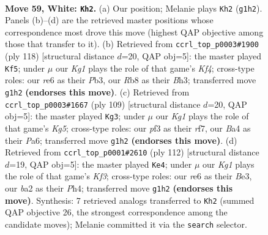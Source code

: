 \documentclass[11pt]{article}
\begin{document}
\clearpage

\begin{figure}[p]\centering
\begin{subfigure}{0.46\textwidth}\centering
\resizebox{\linewidth}{!}{%
\newchessgame
\chessboard[
  setfen={1R6/6k1/4r3/8/B3p2p/4Bp1P/b4P2/6K1 w - - 28 59},
  showmover=false,
  pgfstyle=straightmove, color=movearrow, markmove={g1-h2}
]}
\caption{}
\end{subfigure}\hfill
\begin{subfigure}{0.46\textwidth}\centering
\resizebox{\linewidth}{!}{%
\newchessgame
\chessboard[
  setfen={3k4/5p2/1p6/p1b1P3/P4K1p/1P5B/8/8 w - - 36 60},
  showmover=false,
  pgfstyle=straightmove, color=movearrow, markmove={f4-f5}
]}
\caption{}
\end{subfigure}
\\[4pt]
\begin{subfigure}{0.46\textwidth}\centering
\resizebox{\linewidth}{!}{%
\newchessgame
\chessboard[
  setfen={8/5R2/p2p4/P1b5/1pP3k1/8/KPB5/4r3 b - - 0 55},
  showmover=false,
  pgfstyle=straightmove, color=movearrow, markmove={g4-g3}
]}
\caption{}
\end{subfigure}\hfill
\begin{subfigure}{0.46\textwidth}\centering
\resizebox{\linewidth}{!}{%
\newchessgame
\chessboard[
  setfen={7k/6p1/3r4/p6p/1pB4P/1P2BK2/P7/8 w - - 3 57},
  showmover=false,
  pgfstyle=straightmove, color=movearrow, markmove={f3-e4}
]}
\caption{}
\end{subfigure}
\caption{\textbf{Move 59, White: \texttt{Kh2}.} (a) Our position; Melanie plays \texttt{Kh2} (\texttt{g1h2}). Panels (b)--(d) are the retrieved master positions whose correspondence most drove this move (highest QAP objective among those that transfer to it). (b) Retrieved from \texttt{ccrl\_top\_p0003\#1900} (ply 118) [structural distance $d$=20, QAP obj=5]: the master played \texttt{Kf5}; under $\mu$ our \emph{Kg1} plays the role of that game's \emph{Kf4}; cross-type roles: our \emph{r}e6 as their \emph{P}b3, our \emph{R}b8 as their \emph{B}h3; transferred move \texttt{g1h2} \textbf{(endorses this move)}. (c) Retrieved from \texttt{ccrl\_top\_p0003\#1667} (ply 109) [structural distance $d$=20, QAP obj=5]: the master played \texttt{Kg3}; under $\mu$ our \emph{Kg1} plays the role of that game's \emph{Kg5}; cross-type roles: our \emph{p}f3 as their \emph{r}f7, our \emph{B}a4 as their \emph{P}a6; transferred move \texttt{g1h2} \textbf{(endorses this move)}. (d) Retrieved from \texttt{ccrl\_top\_p0001\#2610} (ply 112) [structural distance $d$=19, QAP obj=5]: the master played \texttt{Ke4}; under $\mu$ our \emph{Kg1} plays the role of that game's \emph{Kf3}; cross-type roles: our \emph{r}e6 as their \emph{B}e3, our \emph{b}a2 as their \emph{P}h4; transferred move \texttt{g1h2} \textbf{(endorses this move)}. Synthesis: 7 retrieved analogs transferred to \texttt{Kh2} (summed QAP objective 26, the strongest correspondence among the candidate moves); Melanie committed it via the \texttt{search} selector.}
\label{fig:thought-m116}
\end{figure}
\end{document}
